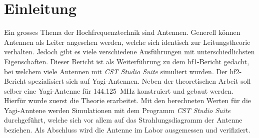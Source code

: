 \section{Einleitung}

Ein grosses Thema der Hochfrequenztechnik sind Antennen. Generell können Antennen als Leiter angesehen werden, welche sich identisch zur Leitungstheorie verhalten. Jedoch gibt es viele verschiedene Ausführungen mit unterschiedlichsten Eigenschaften. Dieser Bericht ist als Weiterführung zu dem hf1-Bericht gedacht, bei welchem viele Antennen mit \textit{CST Studio Suite} simuliert wurden. Der hf2-Bericht spezialisiert sich auf Yagi-Antennen. Neben der theoretischen Arbeit soll selber eine Yagi-Antenne für \SI{144.125}{MHz} konstruiert und gebaut werden. Hierfür wurde zuerst die Theorie erarbeitet. Mit den berechneten Werten für die Yagi-Anntene werden Simulationen mit dem Programm \textit{CST Studio Suite} durchgeführt, welche sich vor allem auf das Strahlungsdiagramm der Antenne beziehen. Als Abschluss wird die Antenne im Labor ausgemessen und verifiziert.